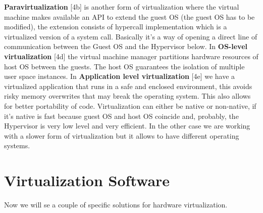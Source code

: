 \miniSpace
\textbf{Paravirtualization} [4b] is another form of virtualization where the virtual machine makes available an API to extend the guest OS (the guest OS has to be modified), the extension consists of hypercall implementation which is a virtualized version of a system call. Basically it's a way of opening a direct line of communication between the Guest OS and the Hypervisor below. \n
\miniSpace
In \textbf{OS-level virtualization} [4d] the virtual machine manager partitions hardware resources of host OS between the guests. The host OS guarantees the isolation of multiple user space instances. \n
\miniSpace
In \textbf{Application level virtualization} [4e] we have a virtualized application that runs in a safe and enclosed environment, this avoids risky memory overwrites that may break the operating system. This also allows for better portability of code. \n
\smallSpace
Virtualization can either be native or non-native, if it's native is fast because guest OS and host OS coincide and, probably, the Hypervisor is very low level and very efficient. In the other case we are working with a slower form of virtualization but it allows to have different operating systems. \n

\section{Virtualization Software}
Now we will se a couple of specific solutions for hardware virtualization.
